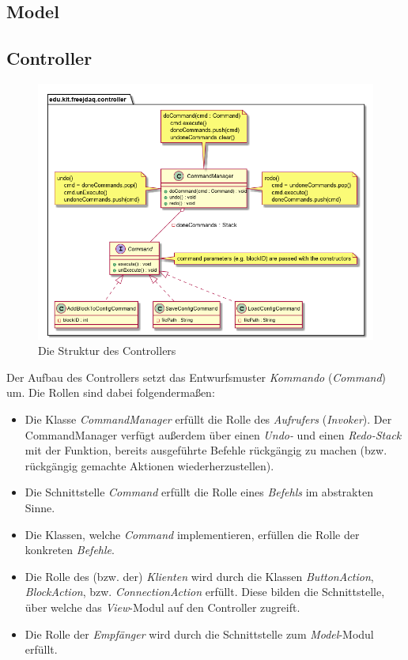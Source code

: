 \documentclass[parskip=full]{scrartcl}
\begin{document}
\clearpage
\subsection{Model}


\clearpage
\subsection{Controller}

\begin{figure}[htbp]
	\begin{center}
		\includegraphics[width = 14cm]{Grafiken/Controller_Struktur.png}
		\caption{Die Struktur des Controllers}
		\label{Entwurf_Grob}
	\end{center}
\end{figure}

Der Aufbau des Controllers setzt das Entwurfsmuster \textit{Kommando} (\textit{Command}) um. Die Rollen sind dabei folgendermaßen:

\begin{itemize}

\item Die Klasse \textit{CommandManager} erfüllt die Rolle des \textit{Aufrufers} (\textit{Invoker}). Der CommandManager verfügt außerdem über einen \textit{Undo-} und einen \textit{Redo-Stack} mit der Funktion, bereits ausgeführte Befehle rückgängig zu machen (bzw. rückgängig gemachte Aktionen wiederherzustellen).
\item Die Schnittstelle \textit{Command} erfüllt die Rolle eines \textit{Befehls} im abstrakten Sinne.
\item Die Klassen, welche \textit{Command} implementieren, erfüllen die Rolle der konkreten \textit{Befehle}.
\item Die Rolle des (bzw. der) \textit{Klienten} wird durch die Klassen \textit{ButtonAction}, \textit{BlockAction}, bzw. \textit{ConnectionAction} erfüllt. Diese bilden die Schnittstelle, über welche das \textit{View}-Modul auf den Controller zugreift.
\item Die Rolle der \textit{Empfänger} wird durch die Schnittstelle zum \textit{Model}-Modul erfüllt.

\end{itemize}
\end{document}

